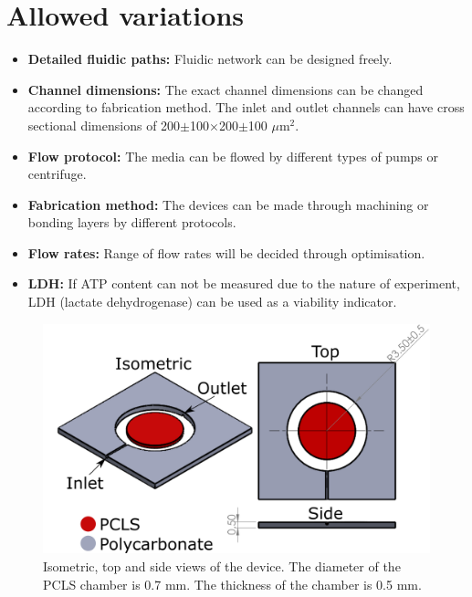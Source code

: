 \documentclass{EU-report}
\begin{document}
\section{Allowed variations}
\begin{itemize}
\item \textbf{Detailed fluidic paths:} Fluidic network can be designed freely.
\item \textbf{Channel dimensions:} The exact channel dimensions can be changed according to fabrication method. The inlet and outlet channels can have cross sectional dimensions of 200$\pm$100$\times$200$\pm$100 $\mu$m$^2$.
\item \textbf{Flow protocol:} The media can be flowed by different types of
pumps or centrifuge.
\item \textbf{Fabrication method:} The devices can be made through machining or
bonding layers by different protocols.
\item \textbf{Flow rates:} Range of flow rates will be decided through
optimisation.
\item \textbf{LDH:} If ATP content can not be measured due to the nature of experiment, LDH (lactate dehydrogenase) can be used as a viability indicator.
\end{itemize}

\begin{figure}
\centering

\includegraphics[width=.8\linewidth,keepaspectratio=true]{./device/tisumr-device.png}
\caption{Isometric, top and side views of the device. The diameter of the PCLS
chamber is 0.7 mm. The thickness of the chamber is 0.5 mm.}
\label{fig:tisumr-device}
\end{figure}
\end{document}
